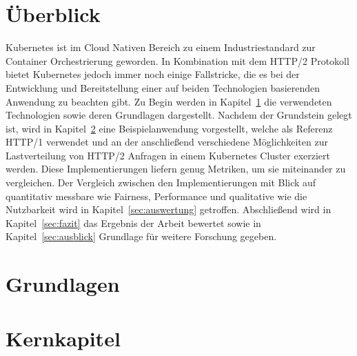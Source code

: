 \documentclass[a4paper,12pt]{article}
\begin{document}

    \frontmatter

    \tableofcontents

    \newpage

    \section*{Überblick}
    Kubernetes ist im Cloud Nativen Bereich zu einem Industriestandard zur Container Orchestrierung geworden.
    In Kombination mit dem HTTP/2 Protokoll bietet Kubernetes jedoch immer noch einige Fallstricke, die es bei der Entwicklung und Bereitstellung einer auf beiden Technologien basierenden Anwendung zu beachten gibt.
    Zu Begin werden in Kapitel~\ref{sec:grundlagen} die verwendeten Technologien sowie deren Grundlagen dargestellt.
    Nachdem der Grundstein gelegt ist, wird in Kapitel~\ref{sec:kernkapitel} eine Beispielanwendung vorgestellt, welche als Referenz HTTP/1 verwendet und an der anschließend verschiedene Möglichkeiten zur Lastverteilung von HTTP/2 Anfragen in einem Kubernetes Cluster exerziert werden.
    Diese Implementierungen liefern genug Metriken, um sie miteinander zu vergleichen.
    Der Vergleich zwischen den Implementierungen mit Blick auf quantitativ messbare wie Fairness, Performance und qualitative wie die Nutzbarkeit wird in Kapitel~\ref{sec:auswertung} getroffen.
    Abschließend wird in Kapitel~\ref{sec:fazit} das Ergebnis der Arbeit bewertet sowie in Kapitel~\ref{sec:ausblick} Grundlage für weitere Forschung gegeben.
    \newpage

    \mainmatter

    \section{Grundlagen}\label{sec:grundlagen}
    

    \section{Kernkapitel}\label{sec:kernkapitel}
    
\end{document}
